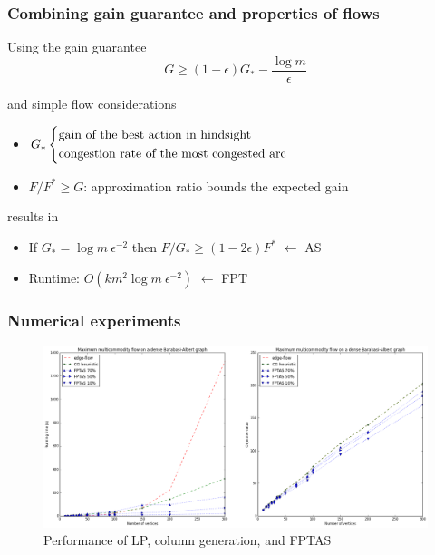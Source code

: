 \documentclass{beamer}
\begin{document}
\begin{frame}
    \frametitle{Combining gain guarantee and properties of flows}

    \begin{block}{Using the gain guarantee}
        \begin{equation*}
            G \geq (1 - \epsilon) G_* - \dfrac{\log m}{\epsilon}
        \end{equation*}
        
    \end{block}

    \begin{block}{and simple flow considerations}
        \begin{itemize}
            \item $G_* \begin{dcases} 
                    \text{gain of the best action in hindsight}\\
                    \text{congestion rate of the most congested arc}
                \end{dcases}$
            \item $F / F^* \geq G$: approximation ratio bounds the
                expected gain
        \end{itemize}
    \end{block}

    \begin{block}{results in}
        \begin{itemize}
            \item If $G_* = \log m~\epsilon^{-2}$ then
                $F / G_* \geq (1 - 2\epsilon) F^*$ \alert{$\leftarrow$ AS}
            \item Runtime: $O(km^2\log m~\epsilon^{-2})$ \alert{$\leftarrow$ FPT}
        \end{itemize}
    \end{block}
\end{frame}

\begin{frame}
    \frametitle{Numerical experiments}
    
    \begin{figure}
    \includegraphics[width=\textwidth]{benchmark_multiflow_ba.png}
    \caption{Performance of LP, column generation, and FPTAS}
    \end{figure}

\end{frame}
\end{document}
